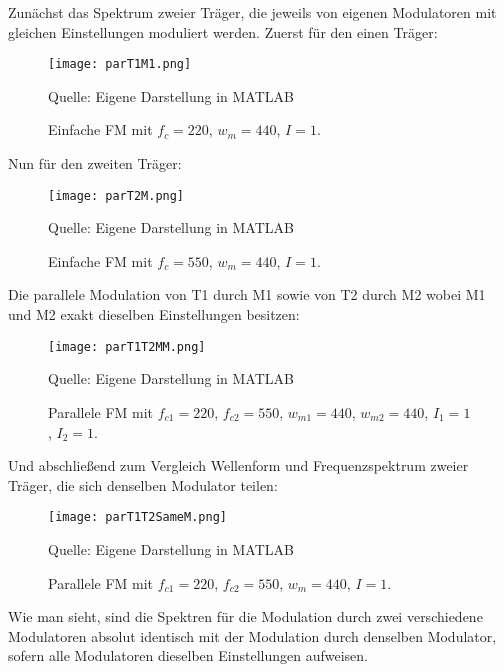 Zunächst das Spektrum zweier Träger, die jeweils von eigenen Modulatoren mit gleichen Einstellungen moduliert werden. Zuerst für den einen Träger:
\FloatBarrier
\begin{figure} [ht]
\centering
  \texttt{[image: parT1M1.png]}
\caption{Einfache FM mit $f_c = 220$, $w_m = 440$, $I = 1$. }
Quelle: Eigene Darstellung in MATLAB
\end{figure}
\FloatBarrier
Nun für den zweiten Träger:
\FloatBarrier
\begin{figure} [ht]
\centering
  \texttt{[image: parT2M.png]}
\caption{Einfache FM mit $f_c = 550$, $w_m = 440$, $I = 1$. }
Quelle: Eigene Darstellung in MATLAB
\end{figure}
\FloatBarrier
Die parallele Modulation von T1 durch M1 sowie von T2 durch M2 wobei M1 und M2 exakt dieselben Einstellungen besitzen:
\FloatBarrier
\begin{figure} [ht]
\centering
  \texttt{[image: parT1T2MM.png]}
\caption{Parallele FM mit $f_{c1} = 220$, $f_{c2} = 550$, $w_{m1} = 440$, $w_{m2} = 440$, $I_1 = 1$, $I_2 = 1$. }
Quelle: Eigene Darstellung in MATLAB
\end{figure}
\FloatBarrier
Und abschließend zum Vergleich Wellenform und Frequenzspektrum zweier Träger, die sich denselben Modulator teilen:
\FloatBarrier
\begin{figure} [ht]
\centering
  \texttt{[image: parT1T2SameM.png]}
\caption{Parallele FM mit $f_{c1} = 220$, $f_{c2} = 550$, $w_{m} = 440$, $I = 1$.  }
Quelle: Eigene Darstellung in MATLAB
\end{figure}
\FloatBarrier
Wie man sieht, sind die Spektren für die Modulation durch zwei verschiedene Modulatoren absolut identisch mit der Modulation durch denselben Modulator, sofern alle Modulatoren dieselben Einstellungen aufweisen.

